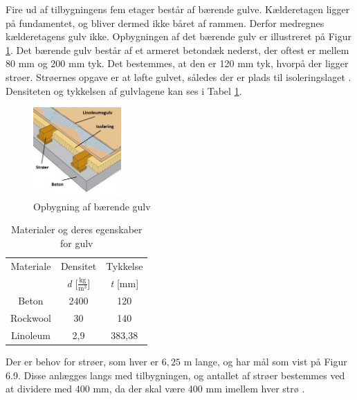 Fire ud af tilbygningens fem etager består af bærende gulve. Kælderetagen ligger på fundamentet, og bliver dermed ikke båret af rammen. Derfor medregnes kælderetagens gulv ikke. 
\newline \indent{     }  Opbygningen af det bærende gulv er illustreret på Figur \ref{fig:gulv}. Det bærende gulv består af et armeret betondæk nederst, der oftest er mellem 80 mm og 200 mm tyk. Det bestemmes, at den er 120 mm tyk, hvorpå der ligger strøer. Strøernes opgave er at løfte gulvet, således der er plads til isoleringslaget \citep{Gulvopbygning}. Densiteten og tykkelsen af gulvlagene kan ses i Tabel \ref{tab:densi}.

\begin{figure}[H]
	\centering
	\includegraphics[width=0.3\textwidth]{billeder/gulv.png}
	\caption{Opbygning af bærende gulv \citep{gulv} \citep{granse}}
	\label{fig:gulv}
\end{figure}

\begin{table}
	\begin{center}
		\begin{tabular}{c c c}
			\hline
			Materiale & Densitet & Tykkelse \\
			& \textit{d} [$\frac{\text{kg}}{\text{m}^3}$] & \textit{t} [mm] \\ \hline
			Beton    & 2400     & 120      \\ 
			Rockwool & 30       & 140      \\ 
			Linoleum & 2,9      & 383,38  \\ 
		\end{tabular}
		\caption{Materialer og deres egenskaber for gulv}
		\label{tab:densi}
	\end{center}
\end{table}

Der er behov for strøer, som hver er $6,\!25$ m lange, og har mål som vist på Figur 6.9. Disse anlægges langs med tilbygningen, og antallet af strøer bestemmes ved at dividere med 400 mm, da der skal være 400 mm imellem hver strø \citep{Gulvopbygning}. 

